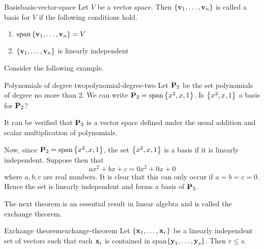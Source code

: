 \begin{definition}{Basis}{basis-vector-space}
Let $V$ be a vector space. Then $\left\{\mbox{\bf v}_{1},\ldots,\mbox{\bf v}_{n}\right\}$ is called a basis for $V$ if the following conditions hold.
\begin{enumerate}
\item
$\sspan\set{\vect{v}_{1},\ldots,\vect{v}_{n}} = V$
\item
$\left\{\mbox{\bf v}_{1},\ldots,\mbox{\bf v}_{n}\right\}$ is linearly independent
\end{enumerate}
\end{definition}

Consider the following example.

\begin{example}{Polynomials of degree two}{polynomial-degree-two}
Let $\mathbf{P}_2$ be the set polynomials of degree no more than 2. We can write
$\Poly_2=\sspan\set{x^{2}, x, 1}$. Is $\left\{x^{2}, x, 1\right\} $ a
basis for $\mathbf{P}_2$?
\end{example}

\begin{solution}
It can be verified that $\mathbf{P}_2$ is a vector space defined under the usual addition and scalar multiplication of polynomials.

Now, since $\Poly_2=\sspan\set{x^{2},x, 1}$, the set  $\left\{x^{2}, x, 1\right\} $ is a basis if it is linearly independent. Suppose then that
\begin{equation*}
ax^{2}+bx+c=0x^2 + 0x + 0
\end{equation*}
where $a,b,c$ are real numbers. It is clear that this can only occur if $a=b=c=0$. Hence the set is linearly independent and forms a basis of $\mathbf{P}_2$.
\end{solution}

The next theorem is an essential result in linear algebra and is called the exchange theorem.

\begin{theorem}{Exchange theorem}{exchange-theorem}
Let $\left\{\mbox{\bf x}_{1},\ldots,\mbox{\bf x}_{r}\right\} $
be a linearly independent set of vectors such that each $\mbox{\bf x}_{i}$ is
contained in span$\left\{\mbox{\bf y}_{1},\ldots,\mbox{\bf y}_{s}\right\}$. Then $
r\leq s$.
\end{theorem}

